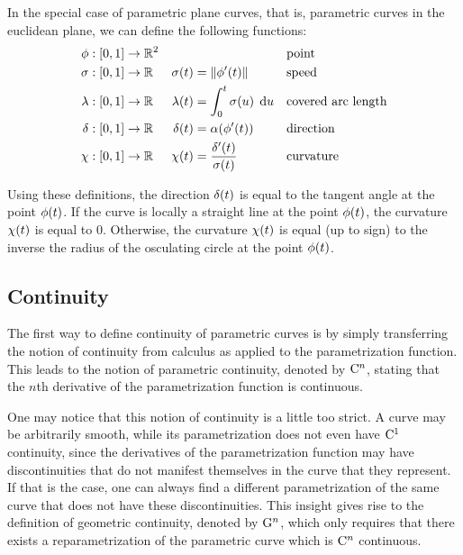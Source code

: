 \documentclass[a4paper]{article}
\begin{document}
			In the special case of parametric plane curves, that is, parametric curves in the euclidean plane, we can define the following functions:
			\begin{align*}
				\phi    & : \function{\unit}{\R{2}} &                    &                                                && \text{point}\\
				\sigma  & : \function{\unit}{\RR}   & \apply{\sigma}{t}  & = \xn{\apply{\phi'}{t}}                        && \text{speed}\\
				\lambda & : \function{\unit}{\RR}   & \apply{\lambda}{t} & = \integral{0}{t}{\apply{\sigma}{u}}{u}        && \text{covered arc length}\\
				\delta  & : \function{\unit}{\RR}   & \apply{\delta}{t}  & = \apply{\alpha}{\apply{\phi'}{t}}             && \text{direction}\\
				\chi    & : \function{\unit}{\RR}   & \apply{\chi}{t}    & = \frac{\apply{\delta'}{t}}{\apply{\sigma}{t}} && \text{curvature}
			\end{align*}

			Using these definitions, the direction \(\delta\!\left( t \right)\) is equal to the tangent angle at the point \(\phi\!\left( t \right)\). If the curve is locally a straight line at the point \(\phi\!\left( t \right)\), the curvature \(\chi\!\left( t \right)\) is equal to \(0\). Otherwise, the curvature \(\chi\!\left( t \right)\) is equal (up to sign) to the inverse the radius of the osculating circle at the point \(\phi\!\left( t \right)\).

		\subsection{Continuity}
		\label{section:continuity}

			The first way to define continuity of parametric curves is by simply transferring the notion of continuity from calculus as applied to the parametrization function. This leads to the notion of parametric continuity, denoted by \(\mathrm{C}^{n}\), stating that the \(n\)th derivative of the parametrization function is continuous.

			One may notice that this notion of continuity is a little too strict. A curve may be arbitrarily smooth, while its parametrization does not even have \(\mathrm{C}^{1}\) continuity, since the derivatives of the parametrization function may have discontinuities that do not manifest themselves in the curve that they represent. If that is the case, one can always find a different parametrization of the same curve that does not have these discontinuities. This insight gives rise to the definition of geometric continuity, denoted by \(\mathrm{G}^{n}\), which only requires that there exists a reparametrization of the parametric curve which is \(\mathrm{C}^{n}\) continuous.
\end{document}
